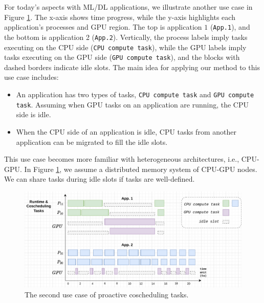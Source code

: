 For today's aspects with ML/DL applications, we illustrate another use case in Figure \ref{fig:proact_coschedule_second_usecase}. The x-axis shows time progress, while the y-axis highlights each application's processes and GPU region. The top is application $1$ (\texttt{App.1}), and the bottom is application 2 (\texttt{App.2}). Vertically, the process labels imply tasks executing on the CPU side (\texttt{CPU compute task}), while the GPU labels imply tasks executing on the GPU side (\texttt{GPU compute task}), and the blocks with dashed borders indicate idle slots. The main idea for applying our method to this use case includes:
\begin{itemize}
	\item An application has two types of tasks, \texttt{CPU compute task} and \texttt{GPU compute task}. Assuming when GPU tasks on an application are running, the CPU side is idle.
	\item When the CPU side of an application is idle, CPU tasks from another application can be migrated to fill the idle slots.
\end{itemize}

This use case becomes more familiar with heterogeneous architectures, i.e., CPU-GPU. In Figure \ref{fig:proact_coschedule_second_usecase}, we assume a distributed memory system of CPU-GPU nodes. We can share tasks during idle slots if tasks are well-defined.\\


\begin{figure}[t]
	\centering
	\includegraphics[scale=0.85]{./pictures/padlb_approach/padlb_coscheduling_second_usecase.pdf}
	\caption{The second use case of proactive coscheduling tasks.}
	\label{fig:proact_coschedule_second_usecase}
\end{figure}

